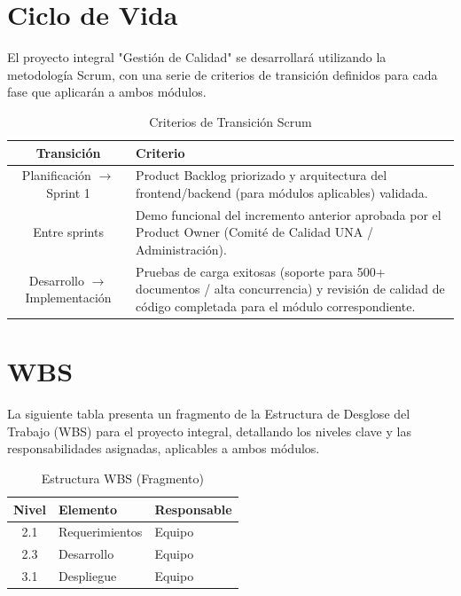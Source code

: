 \section{Ciclo de Vida}
El proyecto integral "Gestión de Calidad" se desarrollará utilizando la metodología Scrum, con una serie de criterios de transición definidos para cada fase que aplicarán a ambos módulos.
\begin{table}[H] %
    \centering
    \begin{tabular}{|c|p{}|}
        \hline
        \textbf{Transición} & \textbf{Criterio} \\
        \hline
        Planificación $\to$ Sprint 1 & Product Backlog priorizado y arquitectura del frontend/backend (para módulos aplicables) validada. \\
        \hline
        Entre sprints & Demo funcional del incremento anterior aprobada por el Product Owner (Comité de Calidad UNA / Administración). \\
        \hline
        Desarrollo $\to$ Implementación & Pruebas de carga exitosas (soporte para 500+ documentos / alta concurrencia) y revisión de calidad de código completada para el módulo correspondiente. \\
        \hline
    \end{tabular}
    \caption{Criterios de Transición Scrum}
\end{table}

\section{WBS}
La siguiente tabla presenta un fragmento de la Estructura de Desglose del Trabajo (WBS) para el proyecto integral, detallando los niveles clave y las responsabilidades asignadas, aplicables a ambos módulos.
\begin{table}[H] %
    \centering
    \begin{tabular}{|c|l|l|}
        \hline
        \textbf{Nivel} & \textbf{Elemento} & \textbf{Responsable} \\
        \hline
        2.1 & Requerimientos & Equipo \\
        2.3 & Desarrollo & Equipo \\
        3.1 & Despliegue & Equipo \\
        \hline
    \end{tabular}
    \caption{Estructura WBS (Fragmento)}
\end{table}

